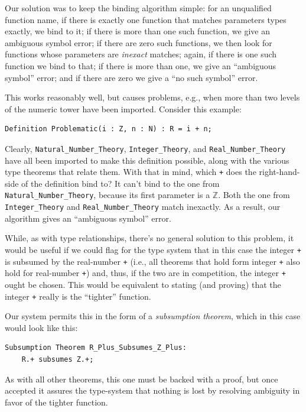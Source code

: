 Our solution was to keep the binding algorithm simple: for an unqualified function name, if there is exactly one function that matches parameters types exactly, we bind to it; if there is more than one such function, we give an ambiguous symbol error; if there are zero such functions, we then look for functions whose parameters are \emph{inexact} matches; again, if there is one such function we bind to that; if there is more than one, we give an ``ambiguous symbol'' error; and if there are zero we give a ``no such symbol'' error.

This works reasonably well, but causes problems, e.g., when more than two levels of the numeric tower have been imported.  Consider this example:

\begin{lstlisting}
Definition Problematic(i : Z, n : N) : R = i + n;
\end{lstlisting}

Clearly, \texttt{Natural\_Number\_Theory}, \texttt{Integer\_Theory}, and \texttt{Real\_Number\_Theory} have all been imported to make this definition possible, along with the various type theorems that relate them.  With that in mind, which \texttt{+} does the right-hand-side of the definition bind to?  It can't bind to the one from \texttt{Natural\_Number\_Theory}, because its first parameter is a $\mathbb{Z}$.  Both the one from \texttt{Integer\_Theory} and \texttt{Real\_Number\_Theory} match inexactly.  As a result, our algorithm gives an ``ambiguous symbol'' error.

While, as with type relationships, there's no general solution to this problem, it would be useful if we could flag for the type system that in this case the integer \texttt{+} is subsumed by the real-number \texttt{+} (i.e., all theorems that hold form integer \texttt{+} also hold for real-number \texttt{+}) and, thus, if the two are in competition, the integer \texttt{+} ought be chosen.  This would be equivalent to stating (and proving) that the integer \texttt{+} really is the ``tighter'' function.

Our system permits this in the form of a \emph{subsumption theorem}, which in this case would look like this:

\begin{lstlisting}
Subsumption Theorem R_Plus_Subsumes_Z_Plus:
	R.+ subsumes Z.+;
\end{lstlisting}

As with all other theorems, this one must be backed with a proof, but once accepted it assures the type-system that nothing is lost by resolving ambiguity in favor of the tighter function.

